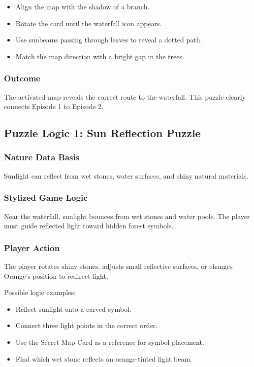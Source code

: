 \documentclass[12pt]{article}
\begin{document}
\begin{itemize}[leftmargin=*]
    \item Align the map with the shadow of a branch.
    \item Rotate the card until the waterfall icon appears.
    \item Use sunbeams passing through leaves to reveal a dotted path.
    \item Match the map direction with a bright gap in the trees.
\end{itemize}

\subsubsection{Outcome}

The activated map reveals the correct route to the waterfall. This puzzle clearly connects Episode 1 to Episode 2.

\subsection{Puzzle Logic 1: Sun Reflection Puzzle}

\subsubsection{Nature Data Basis}

Sunlight can reflect from wet stones, water surfaces, and shiny natural materials.

\subsubsection{Stylized Game Logic}

Near the waterfall, sunlight bounces from wet stones and water pools. The player must guide reflected light toward hidden forest symbols.

\subsubsection{Player Action}

The player rotates shiny stones, adjusts small reflective surfaces, or changes Orange's position to redirect light.

Possible logic examples:

\begin{itemize}[leftmargin=*]
    \item Reflect sunlight onto a carved symbol.
    \item Connect three light points in the correct order.
    \item Use the Secret Map Card as a reference for symbol placement.
    \item Find which wet stone reflects an orange-tinted light beam.
\end{itemize}
\end{document}
